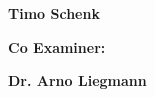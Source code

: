 \documentclass[11pt]{report}
\begin{document}
\begin{titlepage}
{\begin{minipage}[t]{0.47\textwidth}
            \end{minipage}
            \hfill
            \begin{minipage}[t]{0.47\textwidth}
                \raggedleft
                \large \textbf {Timo Schenk}\\
            \end{minipage}
            \begin{minipage}[t]{0.47\textwidth}
                \large \textbf {Co Examiner:}\\
            \end{minipage}
            \hfill
            \begin{minipage}[t]{0.47\textwidth}
                \raggedleft
                \large \textbf {Dr. Arno Liegmann}\\
            \end{minipage}
            \vfill
        }
        \clearpage
        \restoregeometry
    \end{titlepage}
    \newpage
    \hspace{10cm}
    \newpage
    \vspace*{5em}
\end{document}
